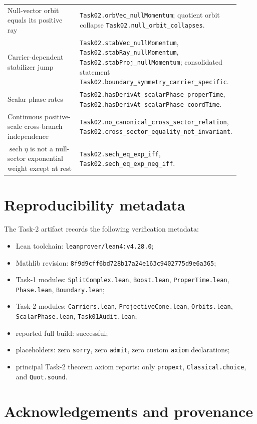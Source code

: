 \documentclass[11pt,a4paper]{article}
\newcommand{\sech}{\operatorname{sech}}
\begin{document}
\begin{longtable}{>{\raggedright\arraybackslash}p{0.31\linewidth} >{\raggedright\arraybackslash}p{0.61\linewidth}}
Null-vector orbit equals its positive ray & \texttt{Task02.orbVec\_nullMomentum}; quotient orbit collapse \texttt{Task02.null\_orbit\_collapses}.\\
Carrier-dependent stabilizer jump & \texttt{Task02.stabVec\_nullMomentum}, \texttt{Task02.stabRay\_nullMomentum}, \texttt{Task02.stabProj\_nullMomentum}; consolidated statement \texttt{Task02.boundary\_symmetry\_carrier\_specific}.\\
Scalar-phase rates & \texttt{Task02.hasDerivAt\_scalarPhase\_properTime}, \texttt{Task02.hasDerivAt\_scalarPhase\_coordTime}.\\
Continuous positive-scale cross-branch independence & \texttt{Task02.no\_canonical\_cross\_sector\_relation}, \texttt{Task02.cross\_sector\_equality\_not\_invariant}.\\
$\sech\eta$ is not a null-sector exponential weight except at rest & \texttt{Task02.sech\_eq\_exp\_iff}, \texttt{Task02.sech\_eq\_exp\_neg\_iff}.\\
\bottomrule
\end{longtable}

\section{Reproducibility metadata}

The Task-2 artifact records the following verification metadata:
\begin{itemize}
\item Lean toolchain: \texttt{leanprover/lean4:v4.28.0};
\item Mathlib revision: \texttt{8f9d9cff6bd728b17a24e163c9402775d9e6a365};
\item Task-1 modules: \texttt{SplitComplex.lean}, \texttt{Boost.lean}, \texttt{ProperTime.lean}, \texttt{Phase.lean}, \texttt{Boundary.lean};
\item Task-2 modules: \texttt{Carriers.lean}, \texttt{ProjectiveCone.lean}, \texttt{Orbits.lean}, \texttt{ScalarPhase.lean}, \texttt{Task01Audit.lean};
\item reported full build: successful;
\item placeholders: zero \texttt{sorry}, zero \texttt{admit}, zero custom \texttt{axiom} declarations;
\item principal Task-2 theorem axiom reports: only \texttt{propext}, \texttt{Classical.choice}, and \texttt{Quot.sound}.
\end{itemize}

\section*{Acknowledgements and provenance}
\end{document}
